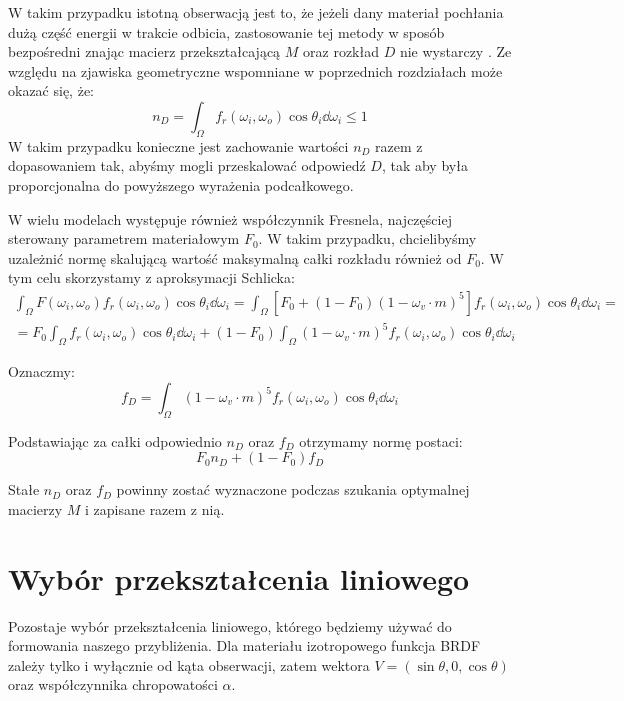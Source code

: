 \documentclass[../main.tex]{subfiles}
\begin{document}
W takim przypadku istotną obserwacją jest to, że jeżeli dany materiał pochłania dużą część energii w trakcie odbicia, zastosowanie tej metody w sposób bezpośredni znając macierz przekształcającą $M$ oraz rozkład $D$ nie wystarczy \cite{LTCFresnelApprox}. Ze względu na zjawiska geometryczne wspomniane w poprzednich rozdziałach może okazać się, że:
\[
    n_D = \int_{\Omega} {
        f_r(\omega_i, \omega_o) \cos\theta_i 
        \dd \omega_i
    } \leq 1
\]
W takim przypadku konieczne jest zachowanie wartości $n_D$ razem z dopasowaniem tak, abyśmy mogli przeskalować odpowiedź $D$, tak aby była proporcjonalna do powyższego wyrażenia podcałkowego.

W wielu modelach występuje również współczynnik Fresnela, najczęściej sterowany parametrem materiałowym $F_0$. W takim przypadku, chcielibyśmy uzależnić normę skalującą wartość maksymalną całki rozkładu również od $F_0$. W tym celu skorzystamy z aproksymacji Schlicka:
\begin{gather*}
\int_{\Omega} {
    F(\omega_i, \omega_o)
    f_r(\omega_i, \omega_o) 
    \cos\theta_i 
    \dd \omega_i
} =
\int_{\Omega} {
    \left[
        F_0 + (1-F_0)(1 - \omega_v \cdot m)^5
    \right]
    f_r(\omega_i, \omega_o) 
    \cos\theta_i 
    \dd \omega_i
} = \\
= F_0 \int_{\Omega} {
    f_r(\omega_i, \omega_o) 
    \cos\theta_i 
    \dd \omega_i
} + (1-F_0) \int_{\Omega} {
    (1 - \omega_v \cdot m)^5
    f_r(\omega_i, \omega_o) 
    \cos\theta_i 
    \dd \omega_i
}
\end{gather*}

Oznaczmy:
\[
    f_D = \int_{\Omega} {
        (1 - \omega_v \cdot m)^5
        f_r(\omega_i, \omega_o) 
        \cos\theta_i 
        \dd \omega_i
    }
\]

\noindent Podstawiając za całki odpowiednio $n_D$ oraz $f_D$ otrzymamy normę postaci:
\[
    F_0 n_D + (1-F_0) f_D
\]

Stałe $n_D$ oraz $f_D$ powinny zostać wyznaczone podczas szukania optymalnej macierzy $M$ i zapisane razem z nią.


\section{Wybór przekształcenia liniowego}

Pozostaje wybór przekształcenia liniowego, którego będziemy używać do formowania naszego przybliżenia. Dla materiału izotropowego funkcja BRDF zależy tylko i wyłącznie od kąta obserwacji, zatem wektora $V = (\sin\theta, 0, \cos\theta)$ oraz współczynnika chropowatości $\alpha$.
\end{document}

